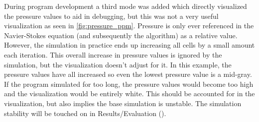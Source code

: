 \label{sec:VizPressureCritique}
During program development a third mode was added which directly visualized the pressure values to aid in debugging, but this was not a very useful visualization as seen in \cref{fig:pressure_ppm}.
Pressure is only ever referenced in the Navier-Stokes equation (and subsequently the algorithm) as a relative value.
However, the simulation in practice ends up increasing all cells by a small amount each iteration.
This overall increase in pressure values is ignored by the simulation, but the visualization doesn't adjust for it.
In this example, the pressure values have all increased so even the lowest pressure value is a mid-gray.
If the program simulated for too long, the pressure values would become too high and the visualization would be entirely white.
This should be accounted for in the visualization, but also implies the base simulation is unstable.
The simulation stability will be touched on in Results/Evaluation (\todoref{}).